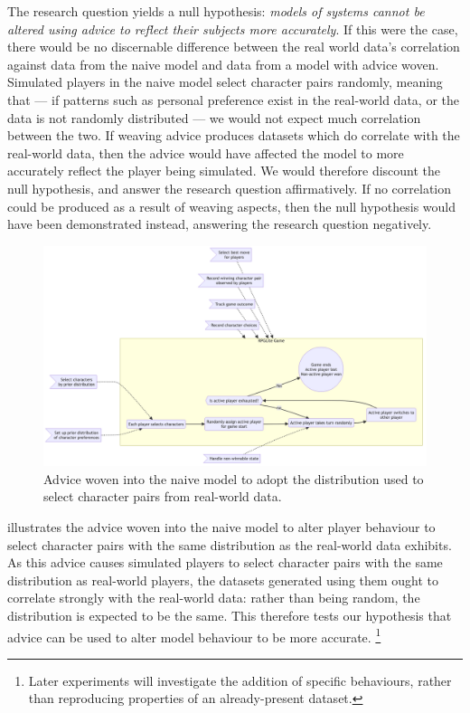 \begin{researchquestion}
\rqtwo{}
\end{researchquestion}

The research question yields a null hypothesis: \emph{models of systems cannot
be altered using advice to reflect their subjects more accurately}. If this were
the case, there would be no discernable difference between the real world data's
correlation against data from the naive model and data from a model with advice
woven. Simulated players in the naive model select character pairs randomly,
meaning that --- if patterns such as personal preference exist in the real-world
data, or the data is not randomly distributed --- we would not expect much
correlation between the two. If weaving advice produces datasets which do
correlate with the real-world data, then the advice would have affected the
model to more accurately reflect the player being simulated. We would therefore
discount the null hypothesis, and answer the research question affirmatively. If
no correlation could be produced as a result of weaving aspects, then the null
hypothesis would have been demonstrated instead, answering the research question
negatively.

\begin{figure}[h]
  \centering
  \includegraphics[width=\columnwidth]{70_generality_of_aspects/diagrams/exp2_prior_distribution_model.png}
  \caption{Advice woven into the naive model to adopt the distribution used to select character pairs from real-world data.}
  \label{fig:exp2_prior_distribution_model}
\end{figure}

 illustrates the advice woven into the
naive model to alter player behaviour to select character pairs with the same
distribution as the real-world data exhibits. As this advice causes simulated
players to select character pairs with the same distribution as real-world
players, the datasets generated using them ought to correlate strongly with the
real-world data: rather than being random, the distribution is expected to be
the same. This therefore tests our hypothesis that advice can be used to alter
model behaviour to be more accurate.
\footnote{
  Later experiments will investigate the addition of specific behaviours, rather
  than reproducing properties of an already-present dataset.
}


